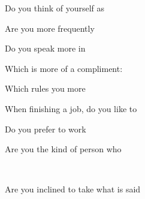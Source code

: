 \documentclass[english,pdf,pagemark,stamp,globalid=\candidateID,oneside,PrintQuestionnaireId=False]{sdaps}
\begin{document}
\begin{questionnaire}
\begin{multicols}{2}
\begin{choicequestion}[2]{Do you think of yourself as}
\end{choicequestion}

\begin{choicequestion}[2]{Are you more frequently}
\end{choicequestion}

\begin{choicequestion}[2]{Do you speak more in}
\end{choicequestion}

\begin{choicequestion}[2]{Which is more of a compliment:}
\end{choicequestion}

\begin{choicequestion}[2]{Which rules you more}
\end{choicequestion}

\begin{choicequestion}[2]{When finishing a job, do you like to}
\end{choicequestion}

\begin{choicequestion}[2]{Do you prefer to work}
\end{choicequestion}

\begin{choicequestion}[2]{Are you the kind of person who}
\end{choicequestion}
\\
\begin{choicequestion}[2]{Are you inclined to take what is said}
\end{choicequestion}


\end{multicols}
\end{questionnaire}
\end{document}
